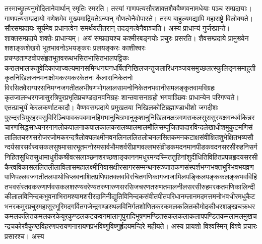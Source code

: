 \begin{sloppypar}\justifying\noindent\hspace{10mm} तस्माच्छ्रुत्यनुमोदितानेवार्थान् स्मृतिः स्मरति। तस्यां गाणपत्य\-सौर\-शाक्त\-शैव\-वैष्णव\-नामधेयाः पञ्च सम्प्रदायाः। गाण\-पत्य\-सम्प्रदायो गणेशमेव मुख्यमाद्रियतेऽन्यान् गौणत्वेनैवोपास्ते। तस्य बाहुल्यमद्यापि महाराष्ट्रे विलोक्यते। सौर\-सम्प्रदायः सूर्यमेव प्रधानत्वेन समर्थयतीतरान् तदङ्गत्वेनैवाञ्चति। अस्य प्राधान्यं गुर्जर\-प्रान्ते। शाक्त\-सम्प्रदाये शक्तेः प्राधान्यम्। अयं सम्प्रदायश्च कश्मीर\-बङ्गयोः प्रचुरः प्रसरति। शैव\-सम्प्रदाये प्रामुख्येन शशाङ्क\-शेखरो भूत\-भावनोऽभयङ्करः प्रलयङ्करः 
काशीश्वरः प्रचण्ड\-ताण्डवोपसंहृत\-भूत\-वरूथ\-भसित\-भासित\-भाल\-पट्टिकः 
कराल\-भाल\-क्रतु\-वेदिका\-जाज्वल्यमान\-समिन्धन\-घन\-धर्षित\-निखिल\-जन्तु\-जलारि\-धनञ्जय\-समुच्छलत्स्फुलिङ्ग\-समाहुतीकृत\-निखिल\-जन\-मनः\-क्षोभ\-कर\-मकर\-केतनः कैलास\-निकेतनो विरसित\-वैराग्य\-रस\-निमग्न\-जगती\-तल\-भीषण\-भोग\-लालसा\-मनो\-निकेतन\-भवानी\-समलङ्कृत\-वाम\-विग्रहः कृत\-जालन्धर\-गजासुर\-त्रिपुर\-प्रभृति\-प्रचण्ड\-दानव\-निग्रहः शान्त\-वासनाग्रहो भगवाञ्छिवः प्राधान्येन परिगण्यते। एतत्प्राचुर्यं केरल\-कर्णाटकादौ। वैष्णव\-सम्प्रदाये प्रमुखतया निखिल\-कोटि\-ब्रह्माण्डाधीशो जगदीशः पुरन्दर\-त्रिपुर\-हर\-वसु\-विरिञ्चि\-पावक\-पवमान\-हिमभानु\-चित्रभानु\-कृशानु\-निखिल\-नक्षत्र\-गण\-सकल\-सुरासुर\-यक्ष\-गन्धर्व\-किन्नर\-चारण\-सिद्ध\-साध्य\-नर\-नाग\-लोक\-पाल\-नाक\-पाल\-काल\-कराल\-व्याल\-माल\-मौलि\-सम्पूजित\-पादारविन्द\-लेखाधीश\-मुकुटमणि\-संलालित\-चरण\-सरोज\-रजो\-मकरन्द\-त्रैलोक्य\-लक्ष्मी\-नवनलिन\-ललित\-लोचन\-लसित\-कमन\-कटाक्ष\-संवीक्षित\-शुभेक्षित\-भव्य\-सौन्दर्य\-सार\-सर्वस्व\-सकल\-सुषमा\-सार\-भूत\-मनोरम\-सार्वभौम\-शर्वरी\-प्राण\-वल्लभ\-संव्रीडक\-मदन\-मान\-पीडक\-वदन\-सरसीरुह\-निसर्ग\-निहित\-सुधित\-सुधा\-माधुरीक\-श्रीवत्स\-लाञ्छन\-शरच्छशाङ्कानन\-मधुर\-मन्द\-स्मित\-तुहिनांशु\-दीधिति\-विहित\-प्रपन्न\-हृदय\-सरसी\-कैरव\-विकास\-ललित\-लीला\-विलास\-महा\-लक्ष्मी\-निवास\-क्षीर\-सागर\-सम्मन्थन\-सञ्जात\-कण\-संस्पर्श\-भग्न\-भक्त\-भूरि\-भव\-भय\-व्रण\-पाणि\-पल्लव\-जगती\-तल\-पाथोधि\-प्लव\-नाशित\-प्रणिपात\-क्लव\-विरचित\-गणिका\-गजाजामिल\-पङ्किल\-पङ्क\-कलङ्क\-भव\-विहित\-भव\-संस्तव\-करुणार्णव\-सकल\-शरण्य\-वरेण्य\-तरुणारुण\-सरसिज\-चरण\-तरुण\-तमाल\-नील\-सरसीरुह\-मरकत\-मणि\-कालिन्दी\-कीलाल\-विनिन्दक\-भुवनाभि\-राम\-श्याम\-शरीर\-दामिनी\-द्युति\-विनिन्दक\-संवीत\-पीत\-परिधान\-म्लान\-मदमत्त\-मनोभव\-धीर\-मधु\-कैटभ\-नरक\-मुर\-प्रचुर\-महासुर\-भूरि\-मद\-गर्वित\-गजेन्द्र\-गण्डस्थल\-विनिर्गत\-शोणित\-करकमल\-कलित\-कौमोदकी\-धर\-शङ्ख\-चक्र\-धर\-कमल\-कलित\-कमल\-कर\-केयूर\-कुण्डल\-कटक\-वनमाला\-नूपुरादि\-भूषण\-मण्डित\-सकल\-कला\-कलाप\-पण्डित\-कमलामल\-मुख\-चन्द्र\-चकोर\-वैकुण्ठ\-विहरण\-परायण\-नारायण\-प्रभविष्णु\-विष्णुर्हृदय\-मन्दिरे महीयते। अस्य प्रायशो विश्वस्मिन् विश्वे प्रचारः प्रसारश्च। अस्य 

\end{sloppypar}
